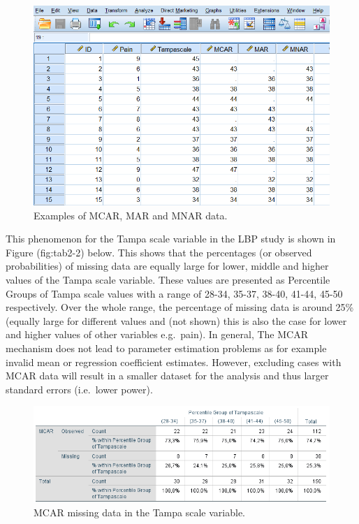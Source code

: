 \documentclass[]{book}
\theoremstyle{definition}
\theoremstyle{definition}
\theoremstyle{definition}
\theoremstyle{remark}
\begin{document}
\begin{figure}

{\centering \includegraphics[width=0.9\linewidth]{images/fig2.7} 

}

\caption{Examples of MCAR, MAR and MNAR data.}\label{fig:fig2-7}
\end{figure}

This phenomenon for the Tampa scale variable in the LBP study is shown
in Figure (fig:tab2-2) below. This shows that the percentages (or
observed probabilities) of missing data are equally large for lower,
middle and higher values of the Tampa scale variable. These values are
presented as Percentile Groups of Tampa scale values with a range of
28-34, 35-37, 38-40, 41-44, 45-50 respectively. Over the whole range,
the percentage of missing data is around 25\% (equally large for
different values and (not shown) this is also the case for lower and
higher values of other variables e.g.~pain). In general, The MCAR
mechanism does not lead to parameter estimation problems as for example
invalid mean or regression coefficient estimates. However, excluding
cases with MCAR data will result in a smaller dataset for the analysis
and thus larger standard errors (i.e.~lower power).

\begin{figure}

{\centering \includegraphics[width=0.9\linewidth]{images/tab2.2} 

}

\caption{MCAR missing data in the Tampa scale variable.}\label{fig:tab2-2}
\end{figure}
\end{document}

